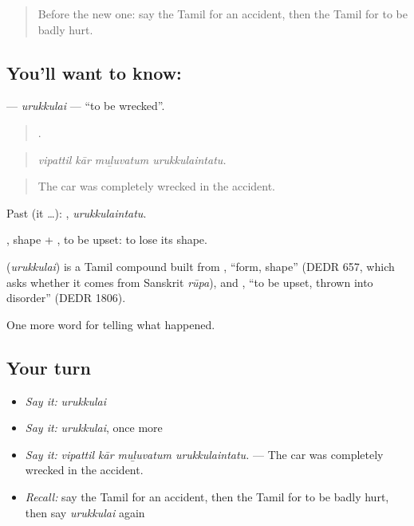 \label{lesson:TA-C298-urukkulai}



\begin{quote}
Before the new one: say the Tamil for an accident, then the Tamil for to be badly hurt.
\end{quote}

\subsection*{You'll want to know: }
\textbf{} — \emph{urukkulai} — \textquotedblleft{}to be wrecked\textquotedblright{}.

\begin{quote}
   .
\end{quote}

\begin{quote}
\emph{vipattil kār muḻuvatum urukkulaintatu.}
\end{quote}

\begin{quote}
The car was completely wrecked in the accident.
\end{quote}

Past (it …): , \emph{urukkulaintatu}.

, shape + , to be upset: to lose its shape.

\begin{cousinweb}
\textbf{} (\emph{urukkulai}) is a Tamil compound built from , \textquotedblleft{}form, shape\textquotedblright{} (DEDR 657, which asks whether it comes from Sanskrit \emph{rūpa}), and , \textquotedblleft{}to be upset, thrown into disorder\textquotedblright{} (DEDR 1806).
\end{cousinweb}

\begin{grammarlens}[title={What you've built}]
One more word for telling what happened.
\end{grammarlens}

\subsection*{Your turn}
\begin{itemize}
\raggedright
  \item \emph{Say it:} \emph{urukkulai}
  \item \emph{Say it:} \emph{urukkulai}, once more
  \item \emph{Say it:} \emph{vipattil kār muḻuvatum urukkulaintatu.} — The car was completely wrecked in the accident.
  \item \emph{Recall:} say the Tamil for an accident, then the Tamil for to be badly hurt, then say \emph{urukkulai} again
\end{itemize}

